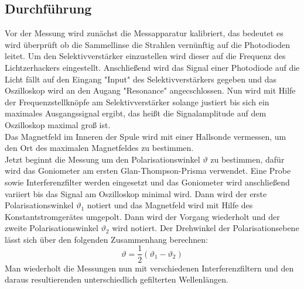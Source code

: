 \subsection{Durchführung}
\label{sec:durch}
Vor der Messung wird zunächst die Messapparatur kalibriert, das bedeutet es wird überprüft ob die Sammellinse die Strahlen vernünftig auf die Photodioden leitet. Um den Selektivverstärker einzustellen wird dieser auf die Frequenz
des Lichtzerhackers eingestellt. Anschließend wird das Signal einer Photodiode auf die Licht fällt auf den Eingang "Input" des Selektivverstärkers gegeben und das Oszilloskop wird an den Augang "Resonance" angecschlossen. Nun wird mit Hilfe der
Frequenzstellknöpfe am Selektivverstärker solange justiert bis sich ein maximales Ausgangssignal ergibt, das heißt die Signalamplitude auf dem Oszilloskop maximal groß ist. \\
Das Magnetfeld im Inneren der Spule wird mit einer Hallsonde vermessen, um den Ort des maximalen Magnetfeldes zu bestimmen. \\
Jetzt beginnt die Messung um den Polarisationswinkel $\vartheta$ zu bestimmen, dafür wird das Goniometer am ersten Glan-Thompson-Prisma verwendet.
 Eine Probe sowie Interferenzfilter werden eingesetzt und das Goniometer wird anschließend variiert bis das Signal am Oszilloskop minimal wird.
  Dann wird der erste Polarisationswinkel $\vartheta_\mathrm{1}$ notiert und das Magnetfeld wird mit Hilfe des Konstantstromgerätes umgepolt. Dann wird der Vorgang wiederholt und der zweite
Polarisationswinkel $\vartheta_\mathrm{2}$ wird notiert. Der Drehwinkel der Polarisationsebene lässt sich über den folgenden Zusammenhang berechnen:
\begin{equation}
  \label{eqn:rotawinkel}
  \vartheta=\dfrac{1}{2}(\vartheta_\mathrm{1}-\vartheta_\mathrm{2})
\end{equation}
Man wiederholt die Messungen nun mit verschiedenen Interferenzfiltern und den daraus resultierenden unterschiedlich gefilterten Wellenlängen.
